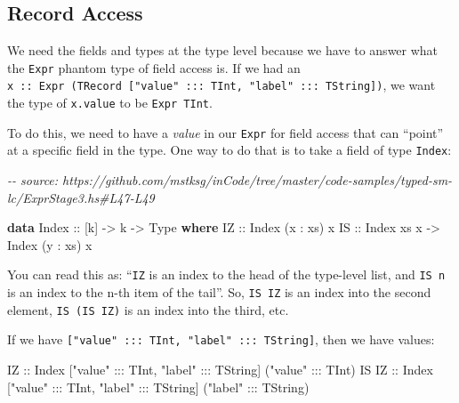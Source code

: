 \documentclass[]{article}
\newenvironment{Shaded}{}{}
\newcommand{\CommentTok}[1]{\textcolor[rgb]{0.38,0.63,0.69}{\textit{#1}}}
\newcommand{\DataTypeTok}[1]{\textcolor[rgb]{0.56,0.13,0.00}{#1}}
\newcommand{\KeywordTok}[1]{\textcolor[rgb]{0.00,0.44,0.13}{\textbf{#1}}}
\newcommand{\NormalTok}[1]{#1}
\newcommand{\OperatorTok}[1]{\textcolor[rgb]{0.40,0.40,0.40}{#1}}
\newcommand{\OtherTok}[1]{\textcolor[rgb]{0.00,0.44,0.13}{#1}}
\newcommand{\StringTok}[1]{\textcolor[rgb]{0.25,0.44,0.63}{#1}}
\begin{document}
\subsection{Record Access}\label{record-access}

We need the fields and types at the type level because we have to answer what
the \texttt{Expr} phantom type of field access is. If we had an
\texttt{x\ ::\ Expr\ (TRecord\ {[}"value"\ :::\ TInt,\ "label"\ :::\ TString{]})},
we want the type of \texttt{x.value} to be \texttt{Expr\ TInt}.

To do this, we need to have a \emph{value} in our \texttt{Expr} for field access
that can ``point'' at a specific field in the type. One way to do that is to
take a field of type \texttt{Index}:

\begin{Shaded}
\begin{Highlighting}[]
\CommentTok{{-}{-} source: https://github.com/mstksg/inCode/tree/master/code{-}samples/typed{-}sm{-}lc/ExprStage3.hs\#L47{-}L49}

\KeywordTok{data} \DataTypeTok{Index}\OtherTok{ ::}\NormalTok{ [k] }\OtherTok{{-}\textgreater{}}\NormalTok{ k }\OtherTok{{-}\textgreater{}} \DataTypeTok{Type} \KeywordTok{where}
  \DataTypeTok{IZ}\OtherTok{ ::} \DataTypeTok{Index}\NormalTok{ (x }\OperatorTok{:}\NormalTok{ xs) x}
  \DataTypeTok{IS}\OtherTok{ ::} \DataTypeTok{Index}\NormalTok{ xs x }\OtherTok{{-}\textgreater{}} \DataTypeTok{Index}\NormalTok{ (y }\OperatorTok{:}\NormalTok{ xs) x}
\end{Highlighting}
\end{Shaded}

You can read this as: ``\texttt{IZ} is an index to the head of the type-level
list, and \texttt{IS\ n} is an index to the n-th item of the tail''. So,
\texttt{IS\ IZ} is an index into the second element, \texttt{IS\ (IS\ IZ)} is an
index into the third, etc.

If we have \texttt{{[}"value"\ :::\ TInt,\ "label"\ :::\ TString{]}}, then we
have values:

\begin{Shaded}
\begin{Highlighting}[]
\DataTypeTok{IZ}\OtherTok{    ::} \DataTypeTok{Index}\NormalTok{ [}\StringTok{"value"} \OperatorTok{:::} \DataTypeTok{TInt}\NormalTok{, }\StringTok{"label"} \OperatorTok{:::} \DataTypeTok{TString}\NormalTok{] (}\StringTok{"value"} \OperatorTok{:::} \DataTypeTok{TInt}\NormalTok{)}
\DataTypeTok{IS} \DataTypeTok{IZ}\OtherTok{ ::} \DataTypeTok{Index}\NormalTok{ [}\StringTok{"value"} \OperatorTok{:::} \DataTypeTok{TInt}\NormalTok{, }\StringTok{"label"} \OperatorTok{:::} \DataTypeTok{TString}\NormalTok{] (}\StringTok{"label"} \OperatorTok{:::} \DataTypeTok{TString}\NormalTok{)}
\end{Highlighting}
\end{Shaded}
\end{document}
